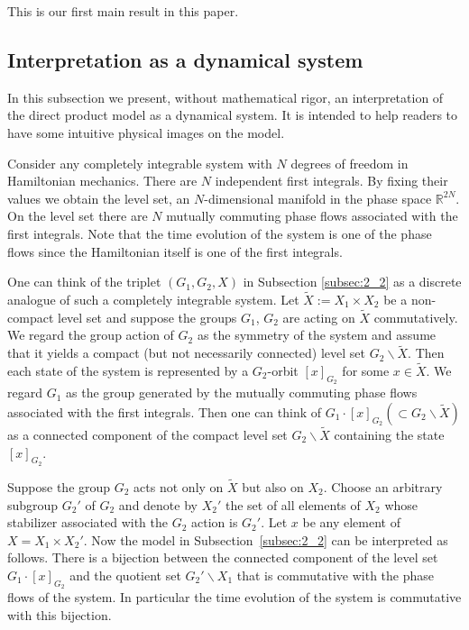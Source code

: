 \documentclass[11pt]{article}
\begin{document}
This is our f\/irst main result in this paper.

\subsection{Interpretation as a dynamical system}\label{subsec:2_3}

In this subsection we present, without mathematical rigor, an interpretation of the direct product model
as a dynamical system.
It is intended to help readers to have some intuitive physical images on the model.


Consider any completely integrable system with $N$ degrees of freedom in Hamiltonian mechanics.
There are $N$ independent f\/irst integrals.
By f\/ixing their values we obtain the level set, an $N$-dimensional manifold in the phase space $\mathbb{R}^{2N}$.
On the level set there are $N$ mutually commuting phase f\/lows associated with the f\/irst integrals.
Note that the time evolution of the system is one of the phase f\/lows since the Hamiltonian itself is one of the f\/irst integrals.


One can think of the triplet $(G_1,G_2,X)$ in Subsection \ref{subsec:2_2} as a discrete analogue of such a completely integrable system.
Let $\tilde{X} := X_1 \times X_2$ be a non-compact level set and suppose
the groups $G_1$, $G_2$ are acting on $\tilde{X}$ commutatively.
We regard the group action of $G_2$ as the symmetry of the system and assume that it yields
a compact (but not necessarily connected) level set $G_2 \backslash \tilde{X}$.
Then each state of the system
is represented by a $G_2$-orbit $[x]_{G_2}$ for some $x \in \tilde{X}$.
We regard $G_1$ as the group generated by the mutually commuting phase f\/lows associated with the f\/irst integrals.
Then one can think of
$G_1 \cdot [x]_{G_2} (\subset G_2 \backslash \tilde{X})$ as a connected component of the compact level set
$G_2 \backslash \tilde{X}$ containing the state $[x]_{G_2}$.

Suppose the group $G_2$ acts not only on $\tilde{X}$ but also on $X_2$.
Choose an arbitrary subgroup $G_2'$ of $G_2$ and denote by $X_2'$ the set of all elements of $X_2$ whose stabilizer
associated with the $G_2$ action is $G_2'$.
Let $x$ be any element of $X = X_1 \times X_2'$.
Now the model in Subsection~\ref{subsec:2_2}
can be interpreted as follows.
There is a bijection between the connected component of the level set
$G_1 \cdot [x]_{G_2}$
and the quotient set $G_2' \backslash X_1$ that is commutative with the phase f\/lows of the system.
In particular the time evolution of the system is commutative with this bijection.
\end{document}
